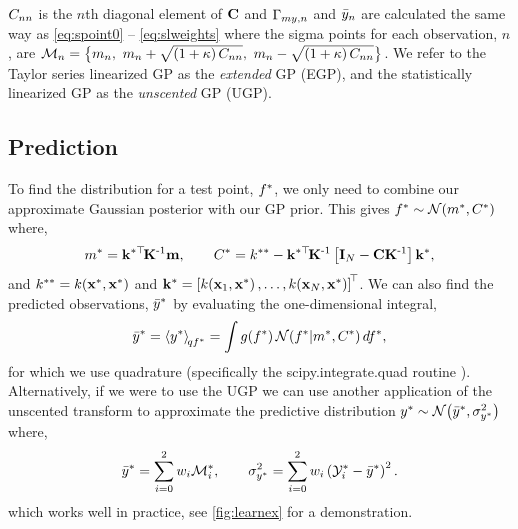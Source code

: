 \documentclass{article} %
\begin{document}
$C_{nn}$ is the $n$th diagonal element of $\mathbf{C}$ and
$\Gamma_{my,n}$ and $\bar{y}_n$ are calculated the same way as
\eqref{eq:spoint0} -- \eqref{eq:slweights} where the sigma points for each
observation, $n$, are $\mathcal{M}_{n} = \big\{m_n,~m_n +
\sqrt{\left({1 + \kappa}\right)C_{nn}},~m_n - \sqrt{\left({1 +
        \kappa}\right)C_{nn}}\big\}$. We refer to the Taylor series linearized
GP as the \emph{extended} GP (EGP), and the statistically linearized GP as the
\emph{unscented} GP (UGP). 


\subsection{Prediction}

To find the distribution for a test point, $f^{*}$, 
we only need to combine our approximate Gaussian posterior with 
our GP prior. This
gives $f^{*} \sim \mathcal{N}\!\left({m^{*}, C^{*}}\right)$ where,
\begin{equation}
    m^{*} = \mathbf{k}^{*\top}\!\mathbf{K}^{\text{-}1}\mathbf{m},
    \qquad
    C^{*} = k^{**} - \mathbf{k}^{*\top}\!\mathbf{K}^{\text{-}1}\left[{\mathbf{I}_{N} -
        \mathbf{C}\mathbf{K}^{\text{-}1}}\right]\mathbf{k}^{*},
\end{equation}
and $k^{**} = k\!\left({\mathbf{x}^{*}, \mathbf{x}^{*}}\right)$ and $\mathbf{k}^{*}
= \left[{k\!\left({\mathbf{x}_1, \mathbf{x}^{*}}\right), \ldots, k\!\left({\mathbf{x}_N,
        \mathbf{x}^{*}}\right)}\right]^{\!\top}$. We can also find the predicted observations,
$\bar{y}^{*}$ by evaluating the one-dimensional integral,
\begin{equation}
    \bar{y}^{*} = \left\langle{\ensuremath{y}\ensuremath{^{*}}}\right\rangle_{\!{qf^{*}}} = \int
        g\!\left({{f^{*}}}\right) \mathcal{N}\!\left({f^{*}}\middle\vert{\ensuremath{m}\ensuremath{^{*}},
            \ensuremath{C}\ensuremath{^{*}}}\right) df^{*},
\end{equation}
for which we use quadrature (specifically the scipy.integrate.quad routine
\cite{JonesScipy}). Alternatively, if we were to use the UGP we can use another
application of the unscented transform to approximate the predictive
distribution $y^{*} \sim \mathcal{N}\!\left({\bar{y}^{*}, \sigma^2_{y^{*}}}\right)$ where,
\begin{equation}
    \bar{y}^{*} = \sum^2_{i=0} w_i \mathcal{M}_i^{*}, \qquad 
    \sigma^2_{y^{*}} = \sum^2_{i=0} w_i \left({\mathcal{Y}_i^{*} -
        \bar{y}^{*}}\right)^2.
    \label{eq:slpred}
\end{equation}
which works well in practice, see \autoref{fig:learnex} for a
demonstration.
\end{document}
